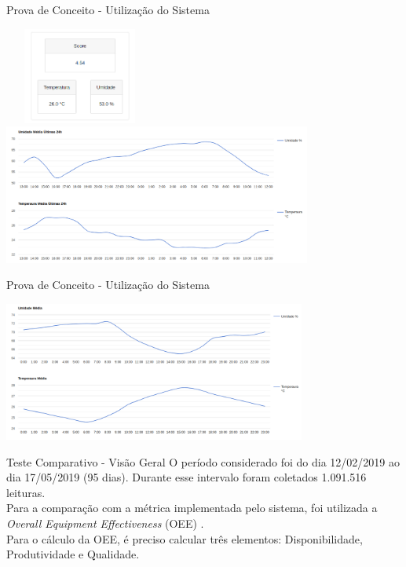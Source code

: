 \documentclass{beamer}
\begin{document}
    \begin{frame}{Prova de Conceito - Utilização do Sistema}
      \begin{center}
        \includegraphics[height=90pt, width=140pt]{prova9}
        \includegraphics[height=130pt, width=\textwidth]{prova10}
      \end{center}
    \end{frame}
    \begin{frame}{Prova de Conceito - Utilização do Sistema}
      \begin{center}
        \includegraphics[height=130pt, width=\textwidth]{prova11}
      \end{center}
    \end{frame}
    \begin{frame}{Teste Comparativo - Visão Geral}
      \null \quad O período considerado foi do dia 12/02/2019 ao dia 17/05/2019 (95 dias). Durante esse intervalo foram coletados 1.091.516 leituras.
      \\\null \quad Para a comparação com a métrica implementada pelo sistema, foi utilizada a \textit{Overall Equipment Effectiveness} (OEE) \cite{artigoOEE}. %
      \\\null \quad Para o cálculo da OEE, é preciso calcular três elementos: Disponibilidade, Produtividade e Qualidade.
    \end{frame}
\end{document}
